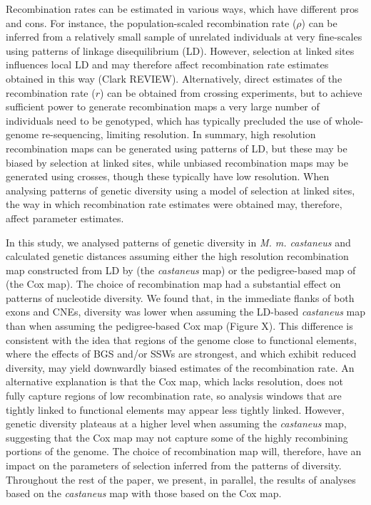\documentclass[11pt]{article}
\begin{document}
	Recombination rates can be estimated in various ways, which have different pros and cons. For instance, the population-scaled recombination rate ($\rho$) can be inferred from a relatively small sample of unrelated individuals at very fine-scales using patterns of linkage disequilibrium (LD). However, selection at linked sites influences local LD and may therefore affect recombination rate estimates obtained in this way (Clark REVIEW). Alternatively, direct estimates of the recombination rate ($r$) can be obtained from crossing experiments, but to achieve sufficient power to generate recombination maps a very large number of individuals need to be genotyped, which has typically precluded the use of whole-genome re-sequencing, limiting resolution. In summary, high resolution recombination maps can be generated using patterns of LD, but these may be biased by selection at linked sites, while unbiased recombination maps may be generated using crosses, though these typically have low resolution. When analysing patterns of genetic diversity using a model of selection at linked sites, the way in which recombination rate estimates were obtained may, therefore, affect parameter estimates.

	In this study, we analysed patterns of genetic diversity in \textit{M. m. castaneus} and calculated genetic distances assuming either the high resolution recombination map constructed from LD by \cite{RN340}(the \textit{castaneus} map) or the pedigree-based map of \cite{RN232} (the Cox map). The choice of recombination map had a substantial effect on patterns of nucleotide diversity. We found that, in the immediate flanks of both exons and CNEs, diversity was lower when assuming the LD-based \textit{castaneus} map than when assuming the pedigree-based Cox map (Figure X). This difference is consistent with the idea that regions of the genome close to functional elements, where the effects of BGS and/or SSWs are strongest, and which exhibit reduced diversity, may yield downwardly biased estimates of the recombination rate. An alternative explanation is that the Cox map, which lacks resolution, does not fully capture regions of low recombination rate, so analysis windows that are tightly linked to functional elements may appear less tightly linked. However, genetic diversity  plateaus at a higher level when assuming the \textit{castaneus} map, suggesting that the Cox map may not capture some of the highly recombining portions of the genome. The choice of recombination map will, therefore, have an impact on the parameters of selection inferred from the patterns of diversity. Throughout the rest of the paper, we present, in parallel, the results of analyses based on the \textit{castaneus} map with those based on the Cox map.
\end{document}
